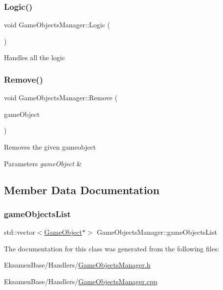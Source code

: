 \subsubsection{\texorpdfstring{Logic()}{Logic()}}
{\footnotesize\ttfamily void Game\+Objects\+Manager\+::\+Logic (\begin{DoxyParamCaption}{ }\end{DoxyParamCaption})}



Handles all the logic 

\mbox{\label{class_game_objects_manager_a9c000e81eed9c5fd9dd374411271cbde}} 
\subsubsection{\texorpdfstring{Remove()}{Remove()}}
{\footnotesize\ttfamily void Game\+Objects\+Manager\+::\+Remove (\begin{DoxyParamCaption}\item[{\mbox{\hyperlink{class_game_object}{Game\+Object}} $\ast$}]{game\+Object }\end{DoxyParamCaption})}



Removes the given gameobject 


\begin{DoxyParams}{Parameters}
{\em game\+Object} & \\
\hline
\end{DoxyParams}


\subsection{Member Data Documentation}
\mbox{\label{class_game_objects_manager_aafa6eaef65b0ecd6ce15d7ac3fcb2f0e}} 
\subsubsection{\texorpdfstring{game\+Objects\+List}{gameObjectsList}}
{\footnotesize\ttfamily std\+::vector$<$\mbox{\hyperlink{class_game_object}{Game\+Object}}$\ast$$>$ Game\+Objects\+Manager\+::game\+Objects\+List}



The documentation for this class was generated from the following files\+:\begin{DoxyCompactItemize}
\item 
Eksamen\+Base/\+Handlers/\mbox{\hyperlink{_game_objects_manager_8h}{Game\+Objects\+Manager.\+h}}\item 
Eksamen\+Base/\+Handlers/\mbox{\hyperlink{_game_objects_manager_8cpp}{Game\+Objects\+Manager.\+cpp}}\end{DoxyCompactItemize}
